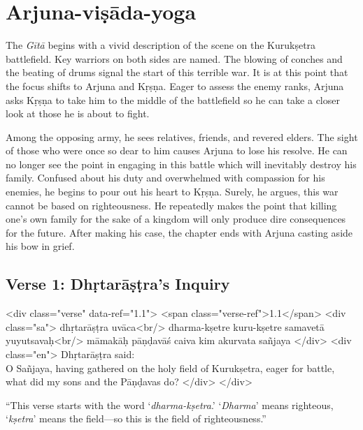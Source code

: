 \chapter{Arjuna-viṣāda-yoga}\label{chap-arjuna-visada-yoga}

\noindent The \textit{Gītā} begins with a vivid description of the scene on the Kurukṣetra battlefield. Key warriors on both sides are named. The blowing of conches and the beating of drums signal the start of this terrible war. It is at this point that the focus shifts to Arjuna and Kṛṣṇa. Eager to assess the enemy ranks, Arjuna asks Kṛṣṇa to take him to the middle of the battlefield so he can take a closer look at those he is about to fight.

Among the opposing army, he sees relatives, friends, and revered elders. The sight of those who were once so dear to him causes Arjuna to lose his resolve. He can no longer see the point in engaging in this battle which will inevitably destroy his family. Confused about his duty and overwhelmed with compassion for his enemies, he begins to pour out his heart to Kṛṣṇa. Surely, he argues, this war cannot be based on righteousness. He repeatedly makes the point that killing one’s own family for the sake of a kingdom will only produce dire consequences for the future. After making his case, the chapter ends with Arjuna casting aside his bow in grief.

\section{Verse 1: Dhṛtarāṣṭra's Inquiry}\label{sec-verse-1-dhrtarastra-s-inquiry}


\begin{html}
<div class="verse" data-ref="1.1">
  <span class="verse-ref">1.1</span>
  <div class="sa">
    dhṛtarāṣṭra uvāca<br/>
    dharma-kṣetre kuru-kṣetre samavetā yuyutsavaḥ<br/>
    māmakāḥ pāṇḍavāś caiva kim akurvata sañjaya
  </div>
  <div class="en">
    \hspace*{1em}Dhṛtarāṣṭra said: \\ O Sañjaya, having gathered on the holy field of Kurukṣetra, eager for battle, what did my sons and the Pāṇḍavas do?
  </div>
</div>
\end{html}


\enquote{This verse starts with the word \enquote{\textit{dharma-kṣetra}.} \enquote{\textit{Dharma}} means righteous, \enquote{\textit{kṣetra}} means the field---so this is the field of righteousness.}

